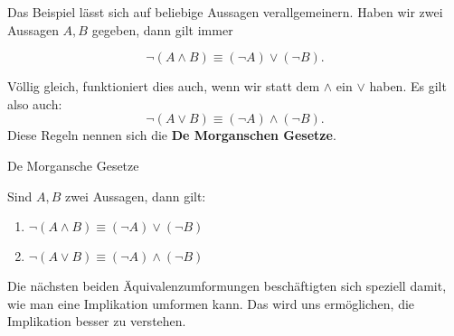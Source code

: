 \documentclass[../../main.tex]{subfiles}
\begin{document}
     Das Beispiel lässt sich auf beliebige Aussagen verallgemeinern. 
     Haben wir zwei Aussagen $A,B$ gegeben, dann gilt immer
     
     \[\lnot( A \land B) \equiv (\lnot A) \lor (\lnot B).\]
     
     Völlig gleich, funktioniert dies auch, wenn wir 
     statt dem $\land$ ein $\lor$ haben. Es gilt also auch:
     \[\lnot( A \lor B) \equiv (\lnot A) \land (\lnot B).\]
     Diese Regeln nennen sich die \textbf{De Morganschen Gesetze}.
     
    \begin{theorem}{De Morgansche Gesetze}

        Sind $A,B$ zwei Aussagen, dann gilt:
        \begin{enumerate}
            \item $\lnot( A \land B) \equiv (\lnot A) \lor (\lnot B)$
            \item $\lnot( A \lor B) \equiv (\lnot A) \land (\lnot B)$
        \end{enumerate}
    \end{theorem}
    
    Die nächsten beiden Äquivalenzumformungen beschäftigten sich speziell damit, wie 
    man eine Implikation umformen kann. Das wird uns ermöglichen,
    die Implikation besser zu verstehen.
    
\end{document}

